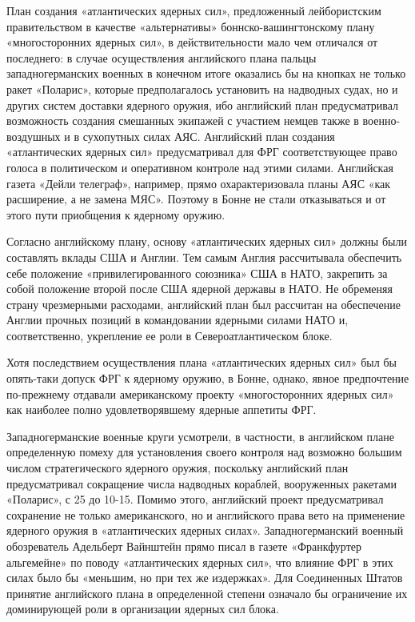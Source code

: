 \documentclass[12pt, a4paper, openany]{book}
\begin{document}
		План создания «атлантических ядерных сил», предложенный лейбористским правительством в качестве «альтернативы» боннско-вашингтонскому плану «многосторонних ядерных сил», в действительности мало чем отличался от последнего: в случае осуществления английского плана пальцы западногерманских военных в конечном итоге оказались бы на кнопках не только ракет «Поларис», которые предполагалось установить на надводных судах, но и других систем доставки ядерного оружия, ибо английский план предусматривал возможность создания смешанных экипажей с участием немцев также в военно-воздушных и в сухопутных силах АЯС. Английский план создания «атлантических ядерных сил» предусматривал для ФРГ соответствующее право голоса в политическом и оперативном контроле над этими силами. Английская газета «Дейли телеграф», например, прямо охарактеризовала планы АЯС «как расширение, а не замена МЯС». Поэтому в Бонне не стали отказываться и от этого пути приобщения к ядерному оружию.
		
		Согласно английскому плану, основу «атлантических ядерных сил» должны были составлять вклады США и Англии. Тем самым Англия рассчитывала обеспечить себе положение «привилегированного союзника» США в НАТО, закрепить за собой положение второй после США ядерной державы в НАТО. Не обременяя страну чрезмерными расходами, английский план был рассчитан на обеспечение Англии прочных позиций в командовании ядерными силами НАТО и, соответственно, укрепление ее роли в Североатлантическом блоке.
		
		Хотя последствием осуществления плана «атлантических ядерных сил» был бы опять-таки допуск ФРГ к ядерному оружию, в Бонне, однако, явное предпочтение по-прежнему отдавали американскому проекту «многосторонних ядерных сил» как наиболее полно удовлетворявшему ядерные аппетиты ФРГ.
		
		Западногерманские военные круги усмотрели, в частности, в английском плане определенную помеху для установления своего контроля над возможно большим числом стратегического ядерного оружия, поскольку английский план предусматривал сокращение числа надводных кораблей, вооруженных ракетами «Поларис», с 25 до 10-15. Помимо этого, английский проект предусматривал сохранение не только американского, но и английского права вето на применение ядерного оружия в «атлантических ядерных силах». Западногерманский военный обозреватель Адельберт Вайнштейн прямо писал в газете «Франкфуртер альгемейне» по поводу «атлантических ядерных сил», что влияние ФРГ в этих силах было бы «меньшим, но при тех же издержках». Для Соединенных Штатов принятие английского плана в определенной степени означало бы ограничение их доминирующей роли в организации ядерных сил блока.
		
\end{document}
